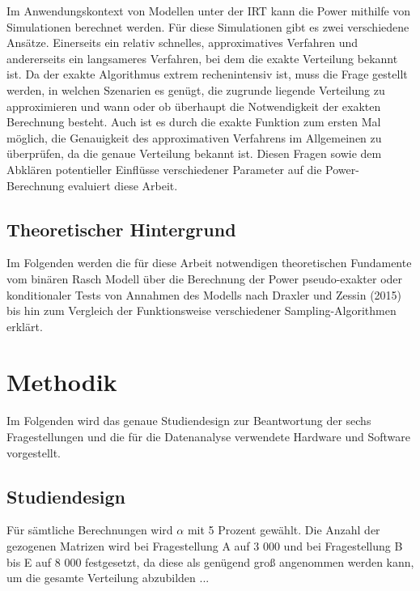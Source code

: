 \documentclass[12pt]{article} %
\begin{document}
	Im Anwendungskontext von Modellen unter der IRT kann die Power mithilfe von Simulationen berechnet werden. Für diese Simulationen gibt es zwei verschiedene Ansätze. Einerseits ein relativ schnelles, approximatives Verfahren und andererseits ein langsameres Verfahren, bei dem die exakte Verteilung bekannt ist. Da der exakte Algorithmus extrem rechenintensiv ist, muss die Frage gestellt werden, in welchen Szenarien es genügt, die zugrunde liegende Verteilung zu approximieren und wann oder ob überhaupt die Notwendigkeit der exakten Berechnung besteht. Auch ist es durch die exakte Funktion zum ersten Mal möglich, die Genauigkeit des approximativen Verfahrens im Allgemeinen zu überprüfen, da die genaue Verteilung bekannt ist. Diesen Fragen sowie dem Abklären potentieller Einflüsse verschiedener Parameter auf die Power-Berechnung evaluiert diese Arbeit.
	
\subsection{Theoretischer Hintergrund}

	Im Folgenden werden die für diese Arbeit notwendigen theoretischen Fundamente vom binären Rasch Modell über die Berechnung der Power pseudo-exakter oder konditionaler Tests von Annahmen des Modells nach Draxler und Zessin (2015) bis hin zum Vergleich der Funktionsweise verschiedener Sampling-Algorithmen erklärt. 
		
\section{Methodik}
	Im Folgenden wird das genaue Studiendesign zur Beantwortung der sechs Fragestellungen und die für die Datenanalyse verwendete Hardware und Software vorgestellt. 

\subsection{Studiendesign}
	Für sämtliche Berechnungen wird $\alpha$ mit 5 Prozent gewählt. Die Anzahl der gezogenen Matrizen wird bei Fragestellung A auf 3 000 und bei Fragestellung B bis E auf 8 000 festgesetzt, da diese als genügend groß angenommen werden kann, um die gesamte Verteilung abzubilden ...
\end{document}
